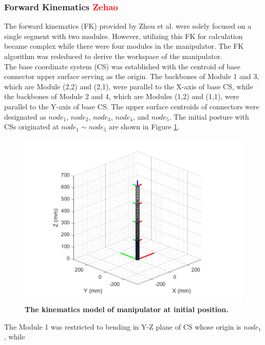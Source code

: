 \subsubsection{Forward Kinematics \textcolor{red}{Zehao}}
The forward kinematics (FK) provided by Zhou et al. \cite{fishboneCR} were solely focused on a single segment 
with two modules. However, utilizing this FK for calculation became complex while there were four modules in 
the manipulator. The FK algorithm was rededuced to derive the workspace of the manipulator. \\
The base coordinate system (CS) was established with the centroid of base connector upper surface serving as 
the origin. The backbones of Module 1 and 3, which are Module (2,2) and (2,1), were parallel to the X-axis 
of base CS, while the backbones of Module 2 and 4, which are Modules (1,2) and (1,1), were parallel to the 
Y-axis of base CS. The upper surface centroids of connectors were designated as $node_1$, $node_2$, $node_3$, 
$node_4$, and $node_5$. The initial posture with CSs originated at $node_1 \sim node_5 $ are shown in 
Figure \ref{fig:kinematics model 0_0_0_0}.  \\
\begin{figure}[H] %
    \centering
    \captionsetup{labelsep=colon}
    \includegraphics[width=1.0\textwidth]{Image/MATLAB/manipulator_0_0_0_0.png} 
    \caption[The kinematics model of manipulator at the initial position]
    {\centering \textbf{The kinematics model of manipulator at initial position.}}
    \label{fig:kinematics model 0_0_0_0}
\end{figure}
\noindent The Module 1 was restricted to bending in Y-Z plane of CS whose origin is $node_1$, while 
